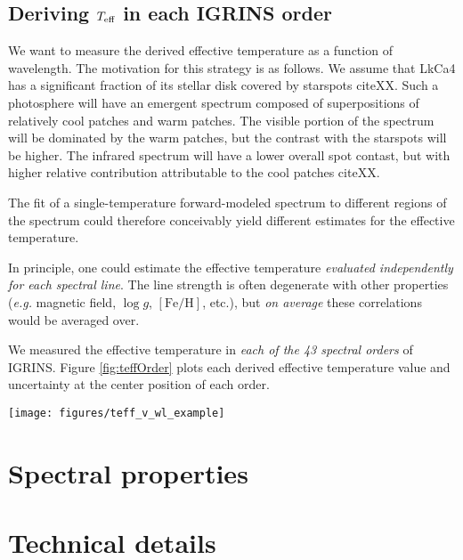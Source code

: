 \documentclass[onecolumn]{emulateapj}%
\begin{document}
\subsection{Deriving $T_\textrm{eff}$ in each IGRINS order}

We want to measure the derived effective temperature as a function of wavelength.  The motivation for this strategy is as follows.  We assume that LkCa4 has a significant fraction of its stellar disk covered by starspots citeXX.  Such a photosphere will have an emergent spectrum composed of superpositions of relatively cool patches and warm patches.  The visible portion of the spectrum will be dominated by the warm patches, but the contrast with the starspots will be higher.  The infrared spectrum will have a lower overall spot contast, but with higher relative contribution attributable to the cool patches citeXX.  

The fit of a single-temperature forward-modeled spectrum to different regions of the spectrum could therefore conceivably yield different estimates for the effective temperature.

In principle, one could estimate the effective temperature \emph{evaluated independently for each spectral line}.  The line strength is often degenerate with other properties (\emph{e.g.} magnetic field, $\log{g}$, $[\mathrm{Fe}/\mathrm{H}]$, etc.), but \emph{on average} these correlations would be averaged over.

We measured the effective temperature in \emph{each of the 43 spectral orders} of IGRINS.  Figure \ref{fig:teffOrder} plots each derived effective temperature value and uncertainty at the center position of each order.

\begin{figure*}
	\centering
	\texttt{[image: figures/teff\_v\_wl\_example]} 
	\caption{Effective temperature as derived by different orders.}
	\label{fig:teffOrder}
\end{figure*}


\section{Spectral properties}\label{sec:lines}


\appendix

\section{Technical details}
\end{document}

